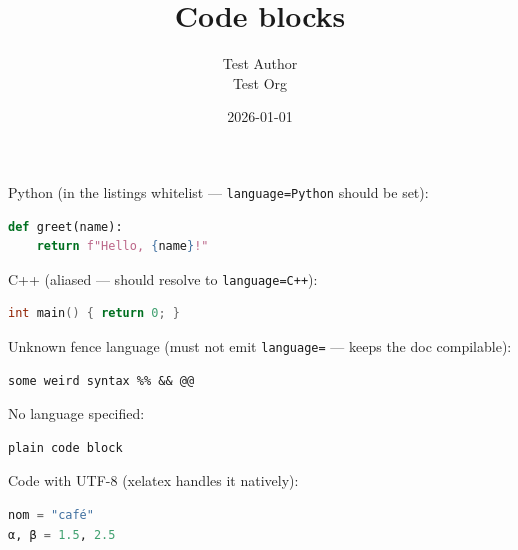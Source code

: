 \documentclass[11pt,a4paper]{article}
\title{Code blocks}
\author{Test Author \\ Test Org}
\date{2026-01-01}
\theoremstyle{definition}
\begin{document}
\maketitle

Python (in the listings whitelist — \texttt{language=Python} should be set):


\begin{lstlisting}[language=Python]
def greet(name):
    return f"Hello, {name}!"
\end{lstlisting}


C++ (aliased — should resolve to \texttt{language=C++}):


\begin{lstlisting}[language=C++]
int main() { return 0; }
\end{lstlisting}


Unknown fence language (must not emit \texttt{language=} — keeps the doc compilable):


\begin{lstlisting}
some weird syntax %% && @@
\end{lstlisting}


No language specified:


\begin{lstlisting}
plain code block
\end{lstlisting}


Code with UTF-8 (xelatex handles it natively):


\begin{lstlisting}[language=Python]
nom = "café"
α, β = 1.5, 2.5
\end{lstlisting}
\end{document}
